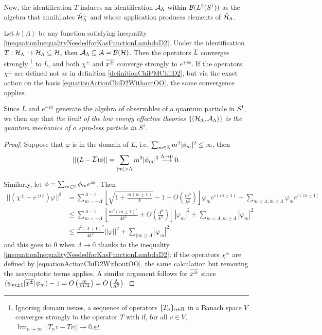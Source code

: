 Now, the identification $T$ induces an identification $\mathcal A_\Lambda$ within $\mathcal B(L^2(S^1))$ as the algebra that annihilates $\tilde {\mathcal H}_\Lambda^\perp$ and whose application produces elements of $\tilde {\mathcal H}_\Lambda$. 

\begin{theorem}\label{theoremConvergesToQMD2}
Let $k(\Lambda)$ be any function satisfying inequality \eqref{inequationInequalityNeededforKasFunctionLambdaD2}. Under the identification $T: \mathcal H_\Lambda \to \tilde {\mathcal H}_\Lambda \subseteq \mathcal H$, then $\mathcal A_\Lambda \subseteq \mathcal A = \mathcal B (\mathcal H)$. Then the operators $\overline{L} $ converges strongly
\footnote{Ignoring domain issues, a sequence of operators $\{T_n\}_{n \in \mathbb{N}}$ in a Banach space $V$ converges strongly to the operator $T$ with if, for all $v \in V$, $\lim_{n \to \infty} ||T_n v - T v|| \to 0$.}
 to $L$, and both $\chi^\pm$ and $\overline{x^\pm}$ converge strongly to $e^{\pm i\phi}$. If the operators $\chi^\pm$ are defined not as in definition \ref{definitionChiPMChiiD2}, but via the exact action on the basis \eqref{equationActionChiD2WithoutOO}, the same convergence applies.

\noindent Since $L$ and $e^{\pm i \phi}$ generate the algebra of observables of a quantum particle in $S^1$, we then say that \emph{the limit of the low energy effective theories $\{(\mathcal H_\Lambda, \mathcal A_\Lambda)\}$ is the quantum mechanics of a spin-less particle in $S^1$}.

\end{theorem}

\begin{proof}
Suppose that $\varphi$ is in the domain of $L$, i.e. $\sum_{m \in \ZZ} m^2 |\phi_m|^2 \leq \infty$, then
\begin{align*}
    ||(L - \cut L)\varphi|| = \sum_{|m| > \Lambda} m^2 |\phi_m|^2 \overset{\Lambda \to 0}{\longrightarrow} 0.
\end{align*}

Similarly, let $\varphi = \sum_{m \in \ZZ} \varphi_m e^{i \phi}$. Then
\begin{align*}
    ||(\chi^\pm - e^{\pm i \phi})\varphi||^2 &= \sum_{m = - \Lambda}^{\Lambda-1} \left[ \sqrt{1 + \frac{m(m \pm 1)}{k}} - 1 + O\left(\frac{m^3}{k^{\frac{3}{2}}} \right)\right] \varphi_m e^{i(m \pm 1)} - \sum_{m < \Lambda, m \geq \Lambda} \varphi_m e^{i(m \pm 1)}\\
    &\leq \sum_{m = -\Lambda}^{\Lambda-1} \left[\frac{m^2(m\pm 1)^2}{4k^2} + O\left(\frac{\Lambda^6}{k^{3}} \right)\right] |\varphi_m|^2 + \sum_{m < \Lambda, m \geq \Lambda} |\varphi_m|^2 \\
    &\leq \frac{\Lambda^2(\Lambda+1)^2}{4k^2} ||\varphi||^2 + \sum_{|m|\geq \Lambda} |\varphi_m|^2
\end{align*}
and this goes to $0$ when $\Lambda \to 0$ thanks to the inequality \eqref{inequationInequalityNeededforKasFunctionLambdaD2}; if the operators $\chi^\pm$ are defined by \eqref{equationActionChiD2WithoutOO}, the same calculation but removing the assymptotic terms applies. A similar argument follows for $\overline{x^\pm}$ since $\langle\psi_{m\pm 1} | \overline{x^\pm} | \psi_m\rangle - 1 = O\left(\frac{m}{k^{1/2}}\right) = O\left(\frac{\Lambda}{\Lambda^2} \right)$.
\end{proof}

